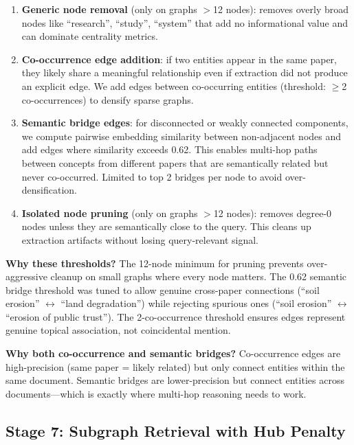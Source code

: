 \documentclass[11pt]{article}
\begin{document}
\begin{enumerate}[leftmargin=1.2em]
  \item \textbf{Generic node removal} (only on graphs $>$12 nodes): removes overly broad nodes like ``research'', ``study'', ``system'' that add no informational value and can dominate centrality metrics.

  \item \textbf{Co-occurrence edge addition}: if two entities appear in the same paper, they likely share a meaningful relationship even if extraction did not produce an explicit edge. We add edges between co-occurring entities (threshold: $\geq$2 co-occurrences) to densify sparse graphs.

  \item \textbf{Semantic bridge edges}: for disconnected or weakly connected components, we compute pairwise embedding similarity between non-adjacent nodes and add edges where similarity exceeds 0.62. This enables multi-hop paths between concepts from different papers that are semantically related but never co-occurred. Limited to top 2 bridges per node to avoid over-densification.

  \item \textbf{Isolated node pruning} (only on graphs $>$12 nodes): removes degree-0 nodes unless they are semantically close to the query. This cleans up extraction artifacts without losing query-relevant signal.
\end{enumerate}

\textbf{Why these thresholds?} The 12-node minimum for pruning prevents over-aggressive cleanup on small graphs where every node matters. The 0.62 semantic bridge threshold was tuned to allow genuine cross-paper connections (``soil erosion'' $\leftrightarrow$ ``land degradation'') while rejecting spurious ones (``soil erosion'' $\leftrightarrow$ ``erosion of public trust''). The 2-co-occurrence threshold ensures edges represent genuine topical association, not coincidental mention.

\textbf{Why both co-occurrence and semantic bridges?} Co-occurrence edges are high-precision (same paper = likely related) but only connect entities within the same document. Semantic bridges are lower-precision but connect entities across documents---which is exactly where multi-hop reasoning needs to work.

\subsection{Stage 7: Subgraph Retrieval with Hub Penalty}
\end{document}
